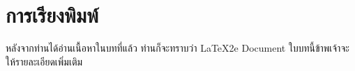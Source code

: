 
\chapter{การเรียงพิมพ์}

หลังจากท่านได้อ่านเนื้อหาในบทที่แล้ว ท่านก็จะทราบว่า \LaTeX2e{} Document
ใบบทนี้ข้าพเจ้าจะให้รายละเอียดเพิ่มเติม

\shbtoaddmoretranslation
